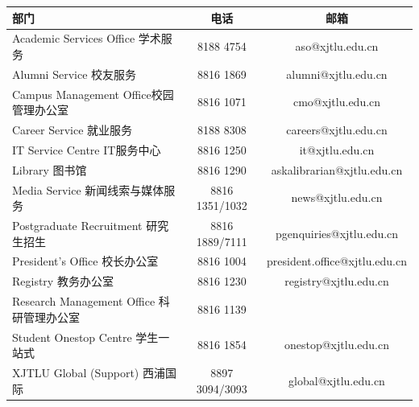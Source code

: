 \begin{table}[H]
    \begin{tabular}{p{60mm}cc}
        \hline
        部门 & 电话 & 邮箱 \\ \hline
        Academic Services Office \newline 学术服务 & 8188 4754 & aso@xjtlu.edu.cn \\ \hline
        Alumni Service \newline 校友服务           & 8816 1869 & alumni@xjtlu.edu.cn \\ \hline
        Campus Management Office\newline 校园管理办公室 & 8816 1071 & cmo@xjtlu.edu.cn \\ \hline
        Career Service \newline 就业服务           & 8188 8308 & careers@xjtlu.edu.cn \\ \hline
        IT Service Centre \newline IT服务中心      & 8816 1250 & it@xjtlu.edu.cn \\ \hline
        Library \newline 图书馆                    & 8816 1290 & askalibrarian@xjtlu.edu.cn \\ \hline
        Media Service \newline 新闻线索与媒体服务    & 8816 1351/1032 & news@xjtlu.edu.cn \\ \hline
        Postgraduate Recruitment \newline 研究生招生 & 8816 1889/7111 & pgenquiries@xjtlu.edu.cn \\ \hline
        President's Office \newline 校长办公室     & 8816 1004 & president.office@xjtlu.edu.cn \\ \hline
        Registry \newline 教务办公室               & 8816 1230 & registry@xjtlu.edu.cn \\ \hline
        Research Management Office \newline 科研管理办公室 & 8816 1139 &  \\ \hline
        Student Onestop Centre \newline 学生一站式 & 8816 1854 & onestop@xjtlu.edu.cn \\ \hline
        XJTLU Global (Support) \newline 西浦国际 & 8897 3094/3093 & global@xjtlu.edu.cn \\ \hline
    \end{tabular}
\end{table}
